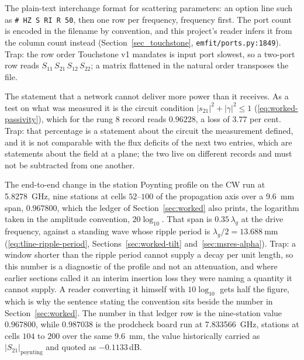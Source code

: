 \begin{description}[leftmargin=1.6em,style=nextline,itemsep=4pt]
  \item[Touchstone; \texttt{.s2p}.]
        The plain-text interchange format for scattering parameters: an option line such as
        \texttt{\# HZ S RI R 50}, then one row per frequency, frequency first. The port count is encoded in the
        filename by convention, and this project's reader infers it from the column count instead
        (Section~\ref{sec_touchstone}, \texttt{emfit/ports.py:1849}). Trap: the row order Touchstone v1 mandates
        is input port slowest, so a two-port row reads $S_{11}\,S_{21}\,S_{12}\,S_{22}$; a matrix flattened in the
        natural order transposes the file.

  \item[Passivity.]
        The statement that a network cannot deliver more power than it receives. As a test on what was measured it
        is the circuit condition $|s_{21}|^2+|\gamma|^2\le1$ (\eqref{eq:worked-passivity}), which for the rung 8
        record reads $0.96228$, a loss of $3.77$ per cent. Trap: that percentage is a statement about the circuit
        the measurement defined, and it is not comparable with the flux deficits of the next two entries, which
        are statements about the field at a plane; the two live on different records and must not be subtracted
        from one another.

  \item[Station-profile tilt diagnostic; insertion loss.]
        The end-to-end change in the station Poynting profile on the CW run at \SI{5.8278}{\giga\hertz}, nine
        stations at cells $52$--$100$ of the propagation axis over a \SI{9.6}{\milli\metre} span, $0.967800$,
        which the ledger of Section~\ref{sec:worked} also prints, the logarithm
        taken in the amplitude convention, $20\log_{10}$. That span is $0.35\,\lambda_g$ at the drive frequency,
        against a standing wave whose ripple period is $\lambda_g/2=\SI{13.688}{\milli\metre}$
        (\eqref{eq:tline-ripple-period}, Sections~\ref{sec:worked-tilt} and~\ref{sec:msres-alpha}). Trap: a
        window shorter than the ripple period cannot supply a decay per unit length, so this number is a
        diagnostic of the profile and not an attenuation, and where earlier sections called it an interim
        insertion loss they were naming a quantity it cannot supply. A reader converting it himself with
        $10\log_{10}$ gets half the figure, which is why the sentence stating the convention sits beside
        the number in Section~\ref{sec:worked}. The number in that ledger row is the nine-station value
        $0.967800$, while $0.987038$ is the prodcheck board run at \SI{7.833566}{\giga\hertz}, stations at cells
        $104$ to $200$ over the same \SI{9.6}{\milli\metre}, the value historically carried as
        $|S_{21}|_{\text{poynting}}$ and quoted as $-0.1133$\,dB.


\end{description}

